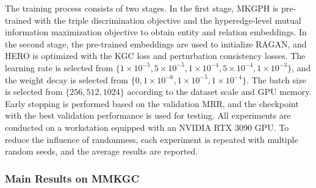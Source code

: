 \documentclass[a4paper,fleqn]{cas-sc}
\begin{document}
The training process consists of two stages. In the first stage, MKGPH is pre-trained with the triple discrimination objective and the hyperedge-level mutual information maximization objective to obtain entity and relation embeddings. In the second stage, the pre-trained embeddings are used to initialize RAGAN, and HERO is optimized with the KGC loss and perturbation consistency losses. The learning rate is selected from $\{1\times10^{-5},5\times10^{-5},1\times10^{-4},5\times10^{-4},1\times10^{-3}\}$, and the weight decay is selected from $\{0,1\times10^{-6},1\times10^{-5},1\times10^{-4}\}$. The batch size is selected from $\{256,512,1024\}$ according to the dataset scale and GPU memory. Early stopping is performed based on the validation MRR, and the checkpoint with the best validation performance is used for testing.
All experiments are conducted on a workstation equipped with an NVIDIA RTX 3090 GPU. To reduce the influence of randomness, each experiment is repeated with multiple random seeds, and the average results are reported.


\subsubsection{Main Results on MMKGC}
\end{document}
